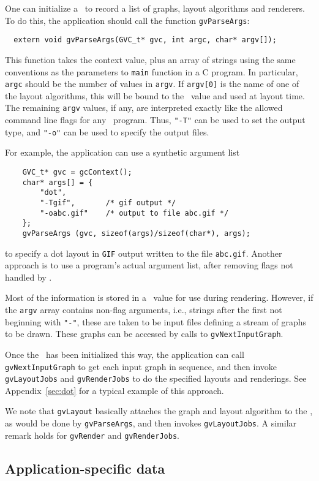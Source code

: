 One can initialize a \gvc\ to record a list of graphs, layout algorithms
and renderers. To do this, the application should
call the function {\tt gvParseArgs}:
\begin{verbatim}
  extern void gvParseArgs(GVC_t* gvc, int argc, char* argv[]);
\end{verbatim}
This function takes the context value, plus an array of strings
using the same conventions as the parameters to {\tt main} function
in a C program. In particular, {\tt argc} should be the number of
values in {\tt argv}. If {\tt argv[0]} is the name of one of the
layout algorithms, this will be bound to the \gvc\ value and used
at layout time.
The remaining {\tt argv} values, if any, are interpreted exactly like
the allowed command line flags for any \gviz\ program.
Thus, {\tt "-T"} can be used to set the output type, and {\tt "-o"}
can be used to specify the output files.

For example, the application can use a synthetic argument list
\begin{verbatim}
    GVC_t* gvc = gcContext();
    char* args[] = {
        "dot",
        "-Tgif",       /* gif output */
        "-oabc.gif"    /* output to file abc.gif */
    };
    gvParseArgs (gvc, sizeof(args)/sizeof(char*), args);
\end{verbatim}
to specify a dot layout in {\tt GIF} output written to the file {\tt abc.gif}.
Another approach is to use a program's actual argument list, 
after removing flags not handled by \gviz.
 
Most of the information is stored in a \gvc\ value for use during
rendering. However,
if the {\tt argv} array contains non-flag arguments, i.e., strings
after the first not beginning with {\tt "-"}, these are taken
to be input files defining a stream of graphs to be drawn. 
These graphs can be accessed by calls to {\tt gvNextInputGraph}.

Once the \gvc\ has been initialized this way, the application can
call {\tt gvNextInputGraph} to get each input graph in sequence, and
then invoke {\tt gvLayoutJobs} and {\tt gvRenderJobs}
to do the specified layouts and renderings. See
Appendix~\ref{sec:dot} for a typical example of this approach.

We note that {\tt gvLayout} basically attaches the graph
and layout algorithm to the \gvc, as would be done by
{\tt gvParseArgs}, and then invokes {\tt gvLayoutJobs}. A similar
remark holds for {\tt gvRender} and {\tt gvRenderJobs}.
 
\subsection{Application-specific data}
\label{sec:info}

